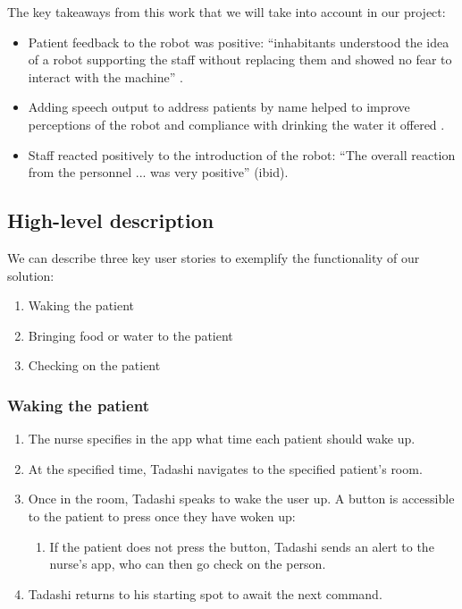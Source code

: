 \documentclass{article}
\begin{document}
The key takeaways from this work that we will take into account in our project:
\begin{itemize}
\item Patient feedback to the robot was positive: ``inhabitants  understood  the  idea  of  a  robot  supporting  the  staff  without replacing them and showed no fear to interact with the machine'' \cite{springer}. 
\item Adding speech output to address patients by name helped to improve perceptions of the robot and compliance with drinking the water it offered \cite{ieee}. 
\item Staff reacted positively to the introduction of the robot: ``The overall reaction from the personnel ... was very positive'' (ibid). 
\end{itemize}

\subsection{High-level description} 
We can describe three key user stories to exemplify the functionality of our solution:
\begin{enumerate}
\item Waking the patient
\item Bringing food or water to the patient
\item Checking on the patient
\end{enumerate}

\subsubsection{Waking the patient}
\begin{enumerate}
\item The nurse specifies in the app what time each patient should wake up.
\item At the specified time, Tadashi navigates to the specified patient's room.
\item Once in the room, Tadashi speaks to wake the user up. A button is accessible to the patient to press once they have woken up:
  \begin{enumerate} 
  \item If the patient does not press the button, Tadashi sends an alert to the nurse's app, who can then go check on the person. 
  \end{enumerate}
\item Tadashi returns to his starting spot to await the next command. 
\end{enumerate}
\end{document}
